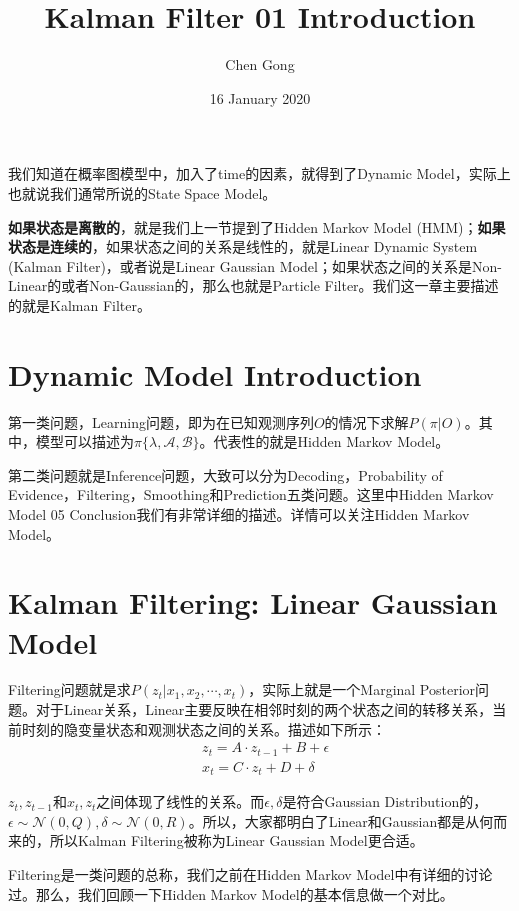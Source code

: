 \documentclass[a4paper]{article}
\title{Kalman Filter 01 Introduction}
\author{Chen Gong}
\date{16 January 2020}
\begin{document}
\maketitle
我们知道在概率图模型中，加入了time的因素，就得到了Dynamic Model，实际上也就说我们通常所说的State Space Model。

\textbf{如果状态是离散的}，就是我们上一节提到了Hidden Markov Model (HMM)；\textbf{如果状态是连续的}，如果状态之间的关系是线性的，就是Linear Dynamic System (Kalman Filter)，或者说是Linear Gaussian Model；如果状态之间的关系是Non-Linear的或者Non-Gaussian的，那么也就是Particle Filter。我们这一章主要描述的就是Kalman Filter。

\section{Dynamic Model Introduction}
第一类问题，Learning问题，即为在已知观测序列$O$的情况下求解$P(\pi|O)$。其中，模型可以描述为$\pi\{ \lambda,\mathcal{A},\mathcal{B} \}$。代表性的就是Hidden Markov Model。

第二类问题就是Inference问题，大致可以分为Decoding，Probability of Evidence，Filtering，Smoothing和Prediction五类问题。这里中Hidden Markov Model 05 Conclusion我们有非常详细的描述。详情可以关注Hidden Markov Model。

\section{Kalman Filtering: Linear Gaussian Model}
Filtering问题就是求$P(z_t|x_1,x_2,\cdots,x_t)$，实际上就是一个Marginal Posterior问题。对于Linear关系，Linear主要反映在相邻时刻的两个状态之间的转移关系，当前时刻的隐变量状态和观测状态之间的关系。描述如下所示：
\begin{equation}
    \begin{split}
        & z_t = A\cdot z_{t-1} + B + \epsilon \\
        & x_t = C\cdot z_{t} + D + \delta
    \end{split}
\end{equation}

$z_t,z_{t-1}$和$x_t,z_t$之间体现了线性的关系。而$\epsilon,\delta$是符合Gaussian Distribution的，$\epsilon \sim \mathcal{N}(0,Q),\delta \sim \mathcal{N}(0,R)$。所以，大家都明白了Linear和Gaussian都是从何而来的，所以Kalman Filtering被称为Linear Gaussian Model更合适。

Filtering是一类问题的总称，我们之前在Hidden Markov Model中有详细的讨论过。那么，我们回顾一下Hidden Markov Model的基本信息做一个对比。
\end{document}
